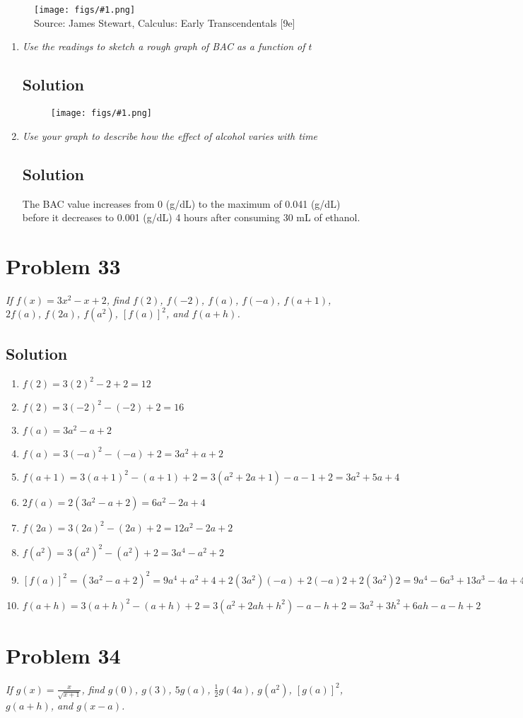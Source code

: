 \documentclass[11pt]{article}
\newcommand{\soln}{\subsection*}
\newcommand{\qn}{\textit}
\newcommand{\imagesource}[1]{{\footnotesize Source: #1}}
\newcommand{\imgqn}[1]{
	\begin{figure}[h]
		\centering
		\texttt{[image: figs/\#1.png]}\\
		\imagesource{James Stewart, Calculus: Early Transcendentals [9e]}
	\end{figure}
}
\newcommand{\imgsoln}[1]{
	\begin{figure}[h]
		\centering
		\texttt{[image: figs/\#1.png]}
	\end{figure}
}
\begin{document}
\imgqn{1.1.32}

\begin{enumerate}
	\item \qn{Use the readings to sketch a rough graph of BAC as a function of $t$}
	\soln{Solution}
	\imgsoln{1.1.32-ans.a}
	
	\item \qn{Use your graph to describe how the effect of alcohol varies with time}
	\soln{Solution}
	The BAC value increases from 0 (g/dL) to the maximum of 0.041 (g/dL) before it decreases to 0.001 (g/dL) 4 hours after consuming 30 mL of ethanol.
\end{enumerate}

\section*{Problem 33}

\qn{If $f(x)=3x^2-x+2$, find $f(2)$, $f(-2)$, $f(a)$, $f(-a)$, $f(a+1)$, $2f(a)$, $f(2a)$, $f(a^2)$, $[f(a)]^2$, and $f(a+h)$.}

\soln{Solution}
\begin{enumerate}
	\item $f(2)=3(2)^2-2+2=12$
	\item $f(2)=3(-2)^2-(-2)+2=16$
	\item $f(a)=3a^2-a+2$
	\item $f(a)=3(-a)^2-(-a)+2=3a^2+a+2$
	\item $f(a+1)=3(a+1)^2-(a+1)+2=3(a^2+2a+1)-a-1+2=3a^2+5a+4$
	\item $2f(a)=2(3a^2-a+2)=6a^2-2a+4$
	\item $f(2a)=3(2a)^2-(2a)+2=12a^2-2a+2$
	\item $f(a^2)=3(a^2)^2-(a^2)+2=3a^4-a^2+2$
	\item $[f(a)]^2=(3a^2-a+2)^2=9a^4+a^2+4+2(3a^2)(-a)+2(-a)2+2(3a^2)2=9a^4-6a^3+13a^3-4a+4$
	\item $f(a+h)=3(a+h)^2-(a+h)+2=3(a^2+2ah+h^2)-a-h+2=3a^2+3h^2+6ah-a-h+2$
\end{enumerate}

\section*{Problem 34}

\qn{If $g(x)=\frac{x}{\sqrt{x+1}}$, find $g(0)$, $g(3)$, $5g(a)$, $\frac{1}{2}g(4a)$, $g(a^2)$, $[g(a)]^2$, $g(a+h)$, and $g(x-a)$.}
\end{document}
